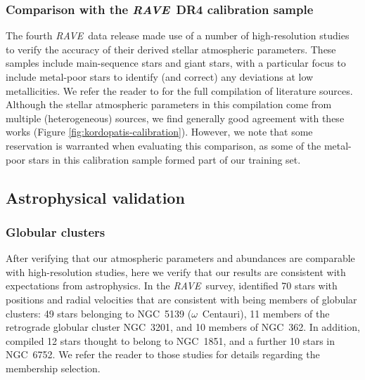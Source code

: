 \documentclass[preprint]{aastex61}
\newcommand{\acronym}[1]{{\small{#1}}}
\newcommand{\project}[1]{\textsl{#1}}
\newcommand{\rave}{\project{\acronym{RAVE}}}
\begin{document}
\subsubsection{Comparison with the \rave\ DR4 calibration sample}
\label{sec:dr4-calibration-sample}


The fourth \rave\ data release made use of a number of high-resolution studies
to verify the accuracy of their derived stellar atmospheric parameters.  These
samples include main-sequence stars and giant stars, with a particular focus to
include metal-poor stars to identify (and correct) any deviations at low
metallicities.  We refer the reader to \citet{Kordopatis_2013} for the full 
compilation of literature sources.  Although the stellar atmospheric parameters
in this compilation come from multiple (heterogeneous) sources, we find 
generally good agreement with these works 
(Figure \ref{fig:kordopatis-calibration}).  However, we note that some 
reservation is warranted when evaluating this comparison, as some of the 
metal-poor stars in this calibration sample formed part of our training set.  


\subsection{Astrophysical validation}
\label{sec:astrophysical-validation}

\subsubsection{Globular clusters}
\label{sec:globular-cluster-validation}


After verifying that our atmospheric parameters and abundances are comparable 
with high-resolution studies, here we verify that our results are consistent
with expectations from astrophysics.  In the \rave\ survey, \cite{Anguiano_2015}
identified 70 stars with positions and radial velocities that are consistent 
with being members of globular clusters: 49 stars belonging to NGC~5139
($\omega$~Centauri), 11 members of the retrograde globular cluster NGC~3201, and 10 
members of NGC~362. In addition, \citet{Kunder_2014} compiled 12 stars thought to 
belong to NGC~1851, and a further 10 stars in NGC~6752.  We refer the reader to 
those studies for details regarding the membership selection.
\end{document}
